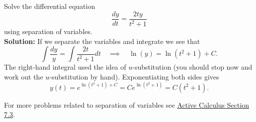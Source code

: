 \begin{example}
   Solve the differential equation 
   \[ \frac{dy}{dt} = \frac{2ty}{t^2+1} \]
   using separation of variables. \\{\bf Solution:}
   If we separate the variables and integrate we see that 
   \[ \int \frac{dy}{y} = \int \frac{2t}{t^2+1} dt \quad \implies \quad \ln(y) =
   \ln(t^2+1)+C. \]
   The right-hand integral used the idea of $u$-substitution (you should stop now and work
   out the $u$-substitution by hand).  Exponentiating both sides gives
   \[ y(t) = e^{\ln(t^2+1)+C} = Ce^{\ln(t^2+1)} = C(t^2+1). \]
\end{example}

For more problems related to separation of variables see
\href{http://faculty.gvsu.edu/boelkinm/Home/AC/sec-7-4-separable.html}{Active Calculus Section
7.3}.  


% 
% 
% 
% 
% 

